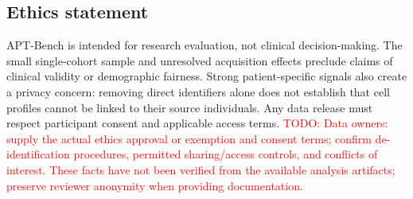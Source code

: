 \documentclass{article} %
\newcommand{\todo}[1]{\textcolor{red}{TODO: #1}}
\begin{document}


\subsection*{Ethics statement}

APT-Bench is intended for research evaluation, not clinical decision-making.
The small single-cohort sample and unresolved acquisition effects preclude
claims of clinical validity or demographic fairness. Strong patient-specific
signals also create a privacy concern: removing direct identifiers alone does
not establish that cell profiles cannot be linked to their source individuals.
Any data release must respect participant consent and applicable access terms.
\todo{Data owners: supply the actual ethics approval or exemption and consent
terms; confirm de-identification procedures, permitted sharing/access controls,
and conflicts of interest. These facts have not been verified from the available
analysis artifacts; preserve reviewer anonymity when providing documentation.}

\end{document}
